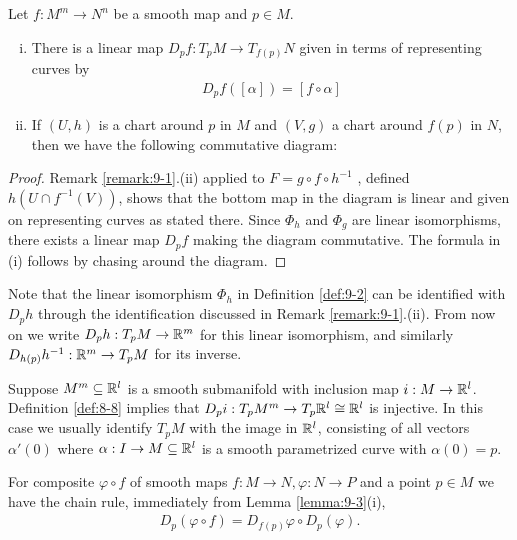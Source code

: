 \begin{lemma}\label{lemma:9-3}
  Let $f:M^m\to N^n$ be a smooth map and $p\in M$.
  \begin{enumerate}[(i)]
    \item There is a linear map $D_pf:T_pM\to T_{f(p)}N$ given in terms of representing 
      curves by 
      \begin{align*}
        D_pf([\alpha]) = [f\circ \alpha]
      \end{align*}
    \item If $(U, h)$ is a chart around $p$ in $M$ and $(V, g)$ a chart around $f(p)$ in $N$,
      then we have the following commutative diagram:
      \begin{center}
      \end{center}
  \end{enumerate}
\end{lemma}

\begin{proof}
  Remark \ref{remark:9-1}.(ii) applied to $F=g\circ f\circ h^{-1}$ , defined
  $h(U\cap f^{-1}(V))$, shows that the bottom map in the diagram is linear and given
  on representing curves as stated there. Since $\Phi_h$ and $\Phi_g$ are linear isomorphisms,
  there exists a linear map $D_pf$ making the diagram commutative. The formula in
  (i) follows by chasing around the diagram.
\end{proof}

Note that the linear isomorphism $\Phi_h$ in Definition \ref{def:9-2} can be identified with $D_ph$
through the identification discussed in Remark \ref{remark:9-1}.(ii). From now on we write 
$D_ph:T_pM\to\mathbb{R}^m$ for this linear isomorphism, and similarly $D_{h(p)}h^{-1}:\mathbb{R}^m\to T_pM$ for 
its inverse.

Suppose $M^m\subseteq \mathbb{R}^l$ is a smooth submanifold with inclusion map $i:M\to \mathbb{R}^l$. 
Definition \ref{def:8-8} implies that $D_pi:T_pM^m\to T_p\mathbb{R}^l\cong \mathbb{R}^l$ is injective. In 
this case we usually identify $T_pM$ with the image in $\mathbb{R}^l$, consisting of all vectors 
$\alpha'(0)$ where $\alpha:I\to M\subseteq\mathbb{R}^l$ is a smooth parametrized curve with $\alpha(0)= p$.

For composite $\varphi\circ f$ of smooth maps $f:M\to N, \varphi:N\to P$ and a point $p\in M$ we have 
the chain rule, immediately from Lemma \ref{lemma:9-3}(i),
\begin{align}\label{eq:9-3}
  D_p(\varphi\circ f) = D_{f(p)}\varphi\circ D_p(\varphi).
\end{align}

